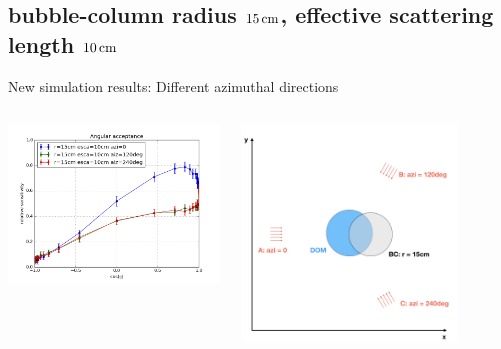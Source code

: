\subsection{bubble-column radius $15\text{\,cm}$, effective scattering length $10\text{\,cm}$}
\begin{frame}[fragile]{New simulation results: Different azimuthal directions}
  \begin{columns}
    \begin{column}{0.5\textwidth}
      \includegraphics[width=\textwidth]{img/summer_scenario_r15cm_esca10cm}
    \end{column}
    \begin{column}{0.5\textwidth}
      \includegraphics[width=0.8\textwidth]{img/summerscenario-004}
    \end{column}
  \end{columns}


\end{frame}
